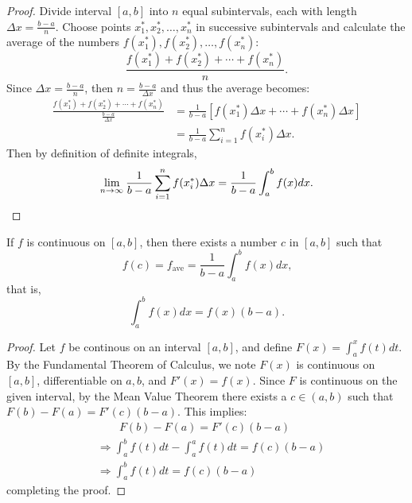 \documentclass[a4paper,11pt]{article}
\begin{document}
\begin{outline}
    \begin{proof}
      Divide interval \([a, b]\) into \(n\) equal subintervals, each with length \(\Delta x = \frac{b-a}{n}\). 
      Choose points \(x_1^*, x_2^*, \ldots, x_n^*\) in successive subintervals and calculate the average of the numbers
      \(f(x_1^*), f(x_2^*), \ldots, f(x_n^*)\): \[ \frac{f(x_1^*) + f(x_2^*) + \cdots + f(x_n^*)}{n}\text{.} \]
      Since \(\Delta x = \frac{b-a}{n}\), then \(n = \frac{b-a}{\Delta x}\) and thus the average becomes:
      \begin{align*}
        \frac{f(x_1^*) + f(x_2^*) + \cdots + f(x_n^*)}{\frac{b-a}{\Delta x}} &= 
          \frac{1}{b-a}\left[f(x_1^*)\Delta x + \cdots + f(x_n^*)\Delta x\right] \\
          &= \frac{1}{b-a}\sum_{i=1}^n f(x_i^*)\Delta x\text{.}
      \end{align*}
      Then by definition of definite integrals, 
      \[
        \lim\limits_{n\rightarrow \infty^{}}\frac{1}{b-a}\sum_{i=1}^n f(x_i^*)\Delta x = \frac{1}{b-a}\int_a^b f(x)dx\text{.}
      \]
    \end{proof}
    
    If \(f\) is continuous on \([a, b]\), then there exists a number \(c\) in \([a, b]\) such that
    \[ f(c) = f_{\text{ave}} = \frac{1}{b-a}\int_a^b f(x)dx\text{,} \] that is, \[ \int_a^b f(x)dx = 
    f(x)(b-a)\text{.} \]
    
    \begin{proof}
      Let \(f\) be continous on an interval \([a, b]\), and define \(F(x) = \int_a^x f(t)dt\). By the 
      Fundamental Theorem of Calculus, we note \(F(x)\) is continuous on \([a, b]\), differentiable on
      \(a, b\), and \(F'(x) = f(x)\). Since \(F\) is continuous on the given interval, by the Mean Value Theorem
      there exists a \(c \in (a, b)\) such that \(F(b) - F(a) = F'(c)(b - a)\). This implies:
      \begin{align*}
        & \qquad F(b) - F(a) = F'(c)(b - a) \\
        &\Rightarrow \int_a^b f(t)dt - \int_a^a f(t)dt = f(c)(b-a) \\
        &\Rightarrow \int_a^b f(t)dt = f(c)(b-a)
      \end{align*}
      completing the proof.
    \end{proof}

\end{outline}
\end{document}
